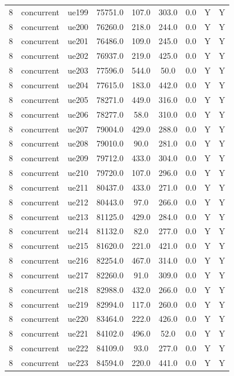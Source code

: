 \begin{table}[ht]
\begin{tabular}{|c|c|c|c|c|c|c|c|c|}
8 & concurrent & ue199 & 75751.0 & 107.0 & 303.0 & 0.0 & Y & Y \\
8 & concurrent & ue200 & 76260.0 & 218.0 & 244.0 & 0.0 & Y & Y \\
8 & concurrent & ue201 & 76486.0 & 109.0 & 245.0 & 0.0 & Y & Y \\
8 & concurrent & ue202 & 76937.0 & 219.0 & 425.0 & 0.0 & Y & Y \\
8 & concurrent & ue203 & 77596.0 & 544.0 & 50.0 & 0.0 & Y & Y \\
8 & concurrent & ue204 & 77615.0 & 183.0 & 442.0 & 0.0 & Y & Y \\
8 & concurrent & ue205 & 78271.0 & 449.0 & 316.0 & 0.0 & Y & Y \\
8 & concurrent & ue206 & 78277.0 & 58.0 & 310.0 & 0.0 & Y & Y \\
8 & concurrent & ue207 & 79004.0 & 429.0 & 288.0 & 0.0 & Y & Y \\
8 & concurrent & ue208 & 79010.0 & 90.0 & 281.0 & 0.0 & Y & Y \\
8 & concurrent & ue209 & 79712.0 & 433.0 & 304.0 & 0.0 & Y & Y \\
8 & concurrent & ue210 & 79720.0 & 107.0 & 296.0 & 0.0 & Y & Y \\
8 & concurrent & ue211 & 80437.0 & 433.0 & 271.0 & 0.0 & Y & Y \\
8 & concurrent & ue212 & 80443.0 & 97.0 & 266.0 & 0.0 & Y & Y \\
8 & concurrent & ue213 & 81125.0 & 429.0 & 284.0 & 0.0 & Y & Y \\
8 & concurrent & ue214 & 81132.0 & 82.0 & 277.0 & 0.0 & Y & Y \\
8 & concurrent & ue215 & 81620.0 & 221.0 & 421.0 & 0.0 & Y & Y \\
8 & concurrent & ue216 & 82254.0 & 467.0 & 314.0 & 0.0 & Y & Y \\
8 & concurrent & ue217 & 82260.0 & 91.0 & 309.0 & 0.0 & Y & Y \\
8 & concurrent & ue218 & 82988.0 & 432.0 & 266.0 & 0.0 & Y & Y \\
8 & concurrent & ue219 & 82994.0 & 117.0 & 260.0 & 0.0 & Y & Y \\
8 & concurrent & ue220 & 83464.0 & 222.0 & 426.0 & 0.0 & Y & Y \\
8 & concurrent & ue221 & 84102.0 & 496.0 & 52.0 & 0.0 & Y & Y \\
8 & concurrent & ue222 & 84109.0 & 93.0 & 277.0 & 0.0 & Y & Y \\
8 & concurrent & ue223 & 84594.0 & 220.0 & 441.0 & 0.0 & Y & Y \\

\end{tabular}
\end{table}
